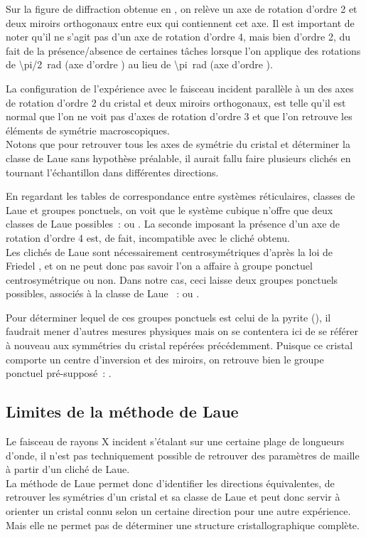Sur la figure de diffraction obtenue en , on relève un axe de rotation d'ordre 2 et deux miroirs orthogonaux entre eux qui contiennent cet axe.
Il est important de noter qu'il ne s'agit pas d'un axe de rotation d'ordre 4, mais bien d'ordre 2, du fait de la présence/absence de certaines tâches lorsque l'on applique des rotations de \SI{\pi/2}{\radian} (axe d'ordre ) au lieu de \SI{\pi}{\radian} (axe d'ordre ).

La configuration de l'expérience avec le faisceau incident parallèle à un des axes de rotation d'ordre 2 du cristal et deux miroirs orthogonaux, est telle qu'il est normal que l'on ne voit pas d'axes de rotation d'ordre 3 et que l'on retrouve les éléments de symétrie macroscopiques\cite{JJRousseau2007}.\\
Notons que pour retrouver tous les axes de symétrie du cristal et déterminer la classe de Laue sans hypothèse préalable, il aurait fallu faire plusieurs clichés en tournant l'échantillon dans différentes directions.

En regardant les tables de correspondance entre systèmes réticulaires, classes de Laue et groupes ponctuels\cite{JJRousseau2007,ShmueliIUCr2016}, on voit que le système cubique n'offre que deux classes de Laue possibles~:  ou .
La seconde imposant la présence d'un axe de rotation d'ordre 4 est, de fait, incompatible avec le cliché obtenu.\\
Les clichés de Laue sont nécessairement centrosymétriques d'après la loi de Friedel , et on ne peut donc pas savoir l'on a affaire à groupe ponctuel centrosymétrique ou non. Dans notre cas, ceci laisse deux groupes ponctuels possibles, associés à la classe de Laue ~:  ou .

Pour déterminer lequel de ces groupes ponctuels est celui de la pyrite (), il faudrait mener d'autres mesures physiques mais on se contentera ici de se référer à nouveau aux symmétries du cristal repérées précédemment.
Puisque ce cristal comporte un centre d'inversion et des miroirs, on retrouve bien le groupe ponctuel pré-supposé~: .

\subsection{Limites de la méthode de Laue}

Le faisceau de rayons X incident s'étalant sur une certaine plage de longueurs d'onde, il n'est pas techniquement possible de retrouver des paramètres de maille à partir d'un cliché de Laue.\\
La méthode de Laue permet donc d'identifier les directions équivalentes, de retrouver les symétries d'un cristal et sa classe de Laue et peut donc servir à orienter un cristal connu selon un certaine direction pour une autre expérience.
Mais elle ne permet pas de déterminer une structure cristallographique complète.

